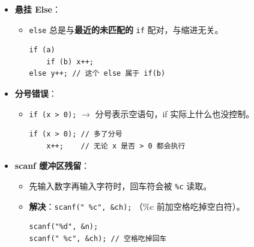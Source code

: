 \documentclass[a4paper,12pt]{article}
\begin{document}
\begin{itemize}
    \item \textbf{悬挂 Else}：
    \begin{itemize}
        \item \texttt{else} 总是与\textbf{最近的未匹配的} \texttt{if} 配对，与缩进无关。
\begin{lstlisting}
if (a)
    if (b) x++;
else y++; // 这个 else 属于 if(b)
\end{lstlisting}
    \end{itemize}
    \item \textbf{分号错误}：
    \begin{itemize}
        \item \texttt{if (x > 0);} $\rightarrow$ 分号表示空语句，if 实际上什么也没控制。
\begin{lstlisting}
if (x > 0); // 多了分号
    x++;    // 无论 x 是否 > 0 都会执行
\end{lstlisting}
    \end{itemize}
    \item \textbf{scanf 缓冲区残留}：
    \begin{itemize}
        \item 先输入数字再输入字符时，回车符会被 \texttt{\%c} 读取。
        \item \textbf{解决}：\texttt{scanf(" \%c", \&ch);} （\%c 前加空格吃掉空白符）。
\begin{lstlisting}
scanf("%d", &n);
scanf(" %c", &ch); // 空格吃掉回车
\end{lstlisting}
    \end{itemize}
\end{itemize}
\end{document}
